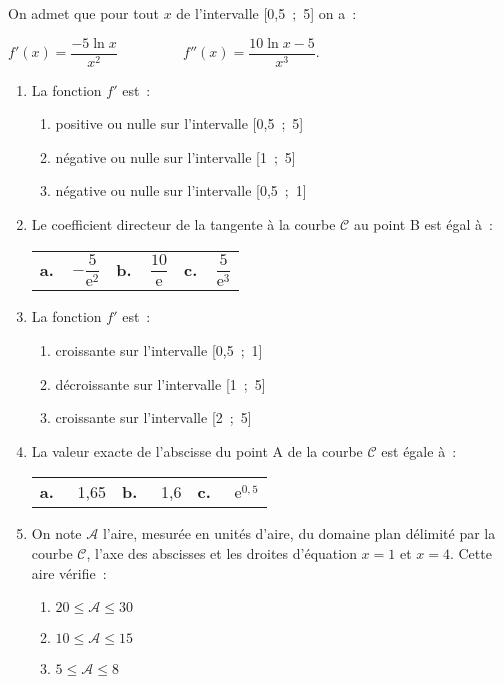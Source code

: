 On admet que pour tout $x$ de l'intervalle [0,5~;~5] on a~:
\par
$f'(x) = \dfrac{- 5\ln x}{x^2}$ $\qquad\qquad$ $f''(x) = \dfrac{10\ln x - 5}{x^3}$.
\medskip
\begin{enumerate}
     \item La fonction $f'$ est~:
     \begin{enumerate}[label=\alph*.]
          \item positive ou nulle sur l'intervalle [0,5~;~5]
          \item négative ou nulle sur l'intervalle [1~;~5]
          \item négative ou nulle sur l'intervalle [0,5~;~1]
     \end{enumerate}
     \medskip
     \item  Le coefficient directeur de la tangente à la courbe $\mathcal{C}$ au point B est égal à~:
     \begin{tabularx}{\linewidth}{*{3}X}  %
          \textbf{a.~~}$- \dfrac{5}{\text{e}^2}$&\textbf{b.~~}$\dfrac{10}{\text{e}}$&\textbf{c.~~}$ \dfrac{5}{\text{e}^3}$
     \end{tabularx}
     \medskip
     \item  La fonction $f'$ est~:
     \begin{enumerate}[label=\alph*.]
          \item croissante sur l'intervalle [0,5~;~1]
          \item décroissante sur l'intervalle [1~;~5]
          \item croissante sur l'intervalle [2~;~5]
     \end{enumerate}
     \medskip
     \item  La valeur exacte de l'abscisse du point A de la courbe $\mathcal{C}$ est égale à~:
     \begin{tabularx}{\linewidth}{*{3}X} %
          \textbf{a.~~} 1,65 &\textbf{b.~~} 1,6 &\textbf{c.~~} $\text{e}^{0,5}$
     \end{tabularx}
     \medskip
     \item  On note $\mathcal{A}$ l'aire, mesurée en unités d'aire, du domaine plan délimité par la courbe $\mathcal{C}$, l'axe des abscisses et les droites d'équation $x = 1$ et $x = 4$. Cette aire vérifie~:
     \begin{enumerate}[label=\alph*.]
          \item $20 \leqslant \mathcal{A} \leqslant 30$
          \item $10\leqslant \mathcal{A} \leqslant 15$
          \item $5 \leqslant \mathcal{A} \leqslant 8$
     \end{enumerate}
\end{enumerate}
